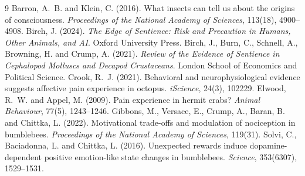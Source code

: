 \documentclass{situationist-preprint}
\begin{document}
\begin{thebibliography}{9}\small
{} Barron, A.~B. and Klein, C. (2016). What insects can tell us about the origins of consciousness. \emph{Proceedings of the National Academy of Sciences}, 113(18), 4900--4908.
 Birch, J. (2024). \emph{The Edge of Sentience: Risk and Precaution in Humans, Other Animals, and AI}. Oxford University Press.
 Birch, J., Burn, C., Schnell, A., Browning, H. and Crump, A. (2021). \emph{Review of the Evidence of Sentience in Cephalopod Molluscs and Decapod Crustaceans}. London School of Economics and Political Science.
 Crook, R.~J. (2021). Behavioral and neurophysiological evidence suggests affective pain experience in octopus. \emph{iScience}, 24(3), 102229.
 Elwood, R.~W. and Appel, M. (2009). Pain experience in hermit crabs? \emph{Animal Behaviour}, 77(5), 1243--1246.
 Gibbons, M., Versace, E., Crump, A., Baran, B. and Chittka, L. (2022). Motivational trade-offs and modulation of nociception in bumblebees. \emph{Proceedings of the National Academy of Sciences}, 119(31).
 Solvi, C., Baciadonna, L. and Chittka, L. (2016). Unexpected rewards induce dopamine-dependent positive emotion-like state changes in bumblebees. \emph{Science}, 353(6307), 1529--1531.
\end{thebibliography}
\end{document}
